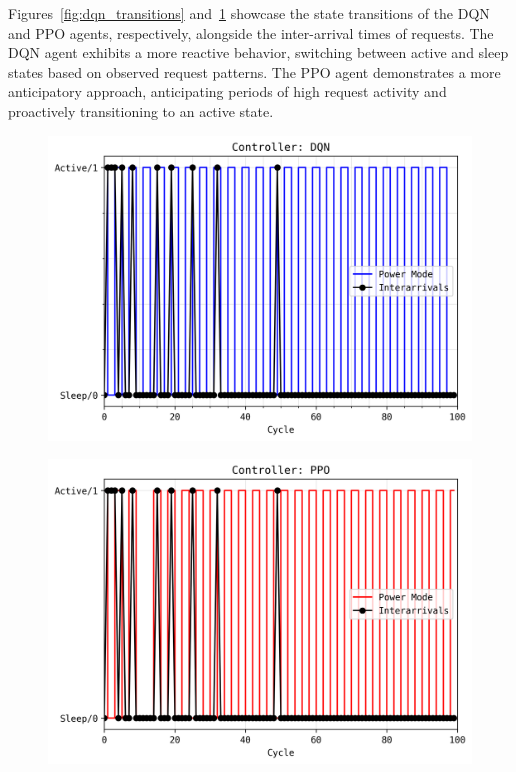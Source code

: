 \documentclass[11pt,a4paper]{article}
\begin{document}
Figures~\ref{fig:dqn_transitions} and~\ref{fig:ppo_transitions} showcase the state transitions of the DQN and PPO agents, respectively, alongside the inter-arrival times of requests. The DQN agent exhibits a more reactive behavior, switching between active and sleep states based on observed request patterns. The PPO agent demonstrates a more anticipatory approach, anticipating periods of high request activity and proactively transitioning to an active state.

\begin{figure}[t]
\centering
\begin{minipage}{.5\textwidth}
  \centering
  \includegraphics[width=.975\linewidth]{figs/dqn_transitions.png}
  \label{fig:dqn_transitions}
\end{minipage}%
\begin{minipage}{.5\textwidth}
  \centering
  \includegraphics[width=.975\linewidth]{figs/ppo_transitions.png}
  \label{fig:ppo_transitions}
\end{minipage}
\end{figure}
\end{document}

